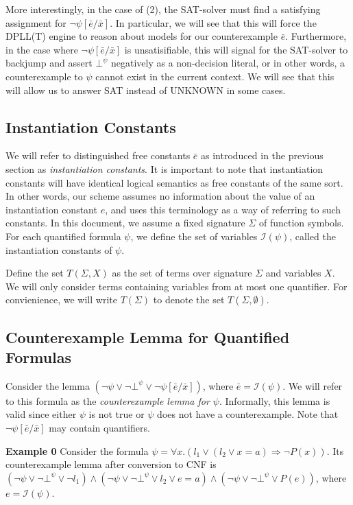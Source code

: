 \documentclass{llncs}
\begin{document}
More interestingly, in the case of (2), the SAT-solver must find a satisfying assignment for $\neg \psi[\bar{e}/\bar{x}]$.
In particular, we will see that this will force the DPLL(T) engine to reason about models for our counterexample $\bar{e}$.
Furthermore, in the case where $\neg \psi[\bar{e}/\bar{x}]$ is unsatisifiable, this will signal for the SAT-solver to backjump and assert $\bot^\psi$ negatively as a non-decision literal, or in other words, a counterexample to $\psi$ cannot exist in the current context.
We will see that this will allow us to answer SAT instead of UNKNOWN in some cases.

\subsection{Instantiation Constants}

We will refer to distinguished free constants $\bar{e}$ as introduced in the previous section as \emph{instantiation constants}.
It is important to note that instantiation constants will have identical logical semantics as free constants of the same sort.
In other words, our scheme assumes no information about the value of an instantiation constant $e$, and uses this terminology as a way of referring to such constants.
In this document, we assume a fixed signature $\Sigma$ of function symbols.
For each quantified formula $\psi$, we define the set of variables $\mathcal{I}( \psi )$, called the instantiation constants of $\psi$.

Define the set $T( \Sigma, X )$ as the set of terms over signature $\Sigma$ and variables $X$.
We will only consider terms containing variables from at most one quantifier.
For convienience, we will write $T( \Sigma )$ to denote the set $T( \Sigma, \emptyset )$.

\subsection{Counterexample Lemma for Quantified Formulas}

Consider the lemma $( \neg \psi \vee \neg \bot^\psi \vee \neg \psi[\bar{e}/\bar{x}])$, where $\bar{e} = \mathcal{I}( \psi )$.
We will refer to this formula as the \emph{counterexample lemma for $\psi$}.
Informally, this lemma is valid since either $\psi$ is not true or $\psi$ does not have a counterexample.
Note that $\neg \psi[\bar{e}/\bar{x}]$ may contain quantifiers.

{\bf Example 0}
Consider the formula $\psi = \forall x. ( l_1 \vee ( l_2 \vee x = a ) \Rightarrow \neg P( x ) )$.
Its counterexample lemma after conversion to CNF is $( \neg \psi \vee \neg \bot^\psi \vee \neg l_1 ) \wedge ( \neg \psi \vee \neg \bot^\psi \vee l_2 \vee e = a ) \wedge ( \neg \psi \vee \neg \bot^\psi \vee P( e ) ) $, where $e = \mathcal{I}( \psi )$. \\
\end{document}
